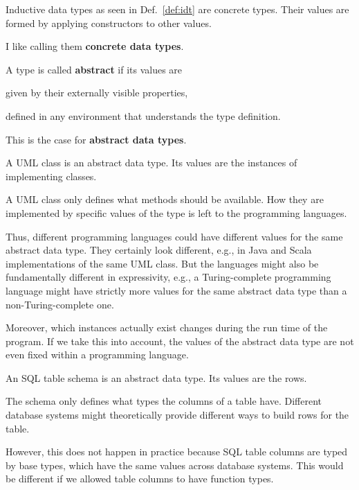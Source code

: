\begin{example}
Inductive data types as seen in Def.~\ref{def:idt} are concrete types.
Their values are formed by applying constructors to other values.

I like calling them \textbf{concrete data types}.
\end{example}

A type is called \textbf{abstract} if its values are
\begin{compactitem}
\item given by their externally visible properties,
\item defined in any environment that understands the type definition.
\end{compactitem}

This is the case for \textbf{abstract data types}.

\begin{example}[Classes]
A UML class is an abstract data type.
Its values are the instances of implementing classes.

A UML class only defines what methods should be available.
How they are implemented by specific values of the type is left to the programming languages.

Thus, different programming languages could have different values for the same abstract data type.
They certainly look different, e.g., in Java and Scala implementations of the same UML class.
But the languages might also be fundamentally different in expressivity, e.g., a Turing-complete programming language might have strictly more values for the same abstract data type than a non-Turing-complete one.

Moreover, which instances actually exist changes during the run time of the program.
If we take this into account, the values of the abstract data type are not even fixed within a programming language.
\end{example}

\begin{example}[Schemas]
An SQL table schema is an abstract data type.
Its values are the rows.

The schema only defines what types the columns of a table have.
Different database systems might theoretically provide different ways to build rows for the table.

However, this does not happen in practice because SQL table columns are typed by base types, which have the same values across database systems.
This would be different if we allowed table columns to have function types.
\end{example}

